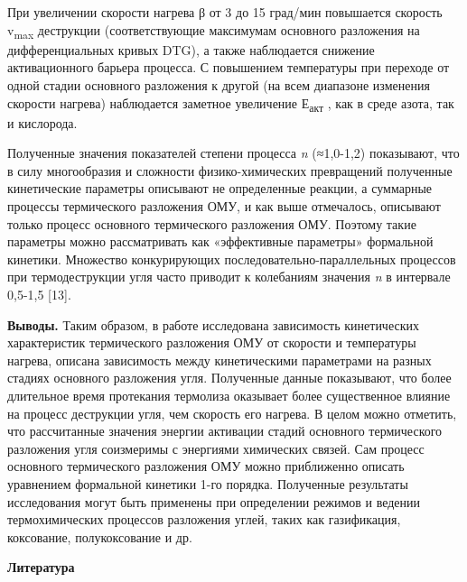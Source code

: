 \begin{multicols}{2}
При увеличении скорости нагрева β от 3 до 15 град/мин повышается
скорость v\textsubscript{max} деструкции (соответствующие максимумам
основного разложения на дифференциальных кривых DTG), а также
наблюдается снижение активационного барьера процесса. С повышением
температуры при переходе от одной стадии основного разложения к другой
(на всем диапазоне изменения скорости нагрева) наблюдается заметное
увеличение Е\textsubscript{акт} , как в среде азота, так и кислорода.

Полученные значения показателей степени процесса \emph{n} (≈1,0-1,2)
показывают, что в силу многообразия и сложности физико-химических
превращений полученные кинетические параметры описывают не определенные
реакции, а суммарные процессы термического разложения ОМУ, и как выше
отмечалось, описывают только процесс основного термического разложения
ОМУ. Поэтому такие параметры можно рассматривать как «эффективные
параметры» формальной кинетики. Множество конкурирующих
последовательно-параллельных процессов при термодеструкции угля часто
приводит к колебаниям значения \emph{n} в интервале 0,5-1,5 {[}13{]}.

{\bfseries Выводы.} Таким образом, в работе исследована зависимость
кинетических характеристик термического разложения ОМУ от скорости и
температуры нагрева, описана зависимость между кинетическими параметрами
на разных стадиях основного разложения угля. Полученные данные
показывают, что более длительное время протекания термолиза оказывает
более существенное влияние на процесс деструкции угля, чем скорость его
нагрева. В целом можно отметить, что рассчитанные значения энергии
активации стадий основного термического разложения угля соизмеримы с
энергиями химических связей. Сам процесс основного термического
разложения ОМУ можно приближенно описать уравнением формальной кинетики
1-го порядка. Полученные результаты исследования могут быть применены
при определении режимов и ведении термохимических процессов разложения
углей, таких как газификация, коксование, полукоксование и др.
\end{multicols}

\begin{center}
{\bfseries Литература}
\end{center}

